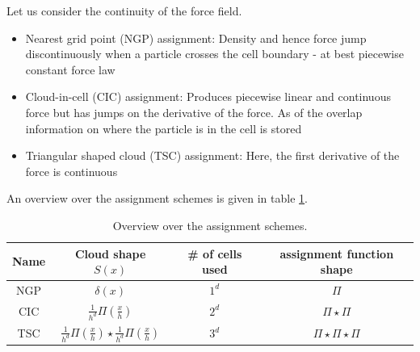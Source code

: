 Let us consider the continuity of the force field.
\begin{itemize}
    \item \textcolor{red1}{Nearest grid point (NGP) assignment}: Density and hence force jump discontinuously when a particle crosses the cell boundary - 
    at best piecewise constant force law
    \item \textcolor{yellow1}{Cloud-in-cell (CIC) assignment}: Produces piecewise linear and continuous force but has jumps on the derivative of the force. As of the overlap
    information on where the particle is in the cell is stored
    \item \textcolor{green1}{Triangular shaped cloud (TSC) assignment}: Here, the first derivative of the force is continuous
\end{itemize}

An overview over the assignment schemes is given in table \ref{tab:assignment_schemes}.

\begin{table}
    \centering
    \begin{tabular}{cccc}
        \hline Name & Cloud shape $S(x)$ & \# of cells used & assignment function shape \\
        \hline \hline NGP & $\delta(x)$ & $1^d$ & $\Pi$ \\
        \hline CIC & $\frac{1}{h^d} \Pi\left(\frac{x}{h}\right)$ & $2^d$ & $\Pi \star \Pi$ \\
        \hline TSC & $\frac{1}{h^d} \Pi\left(\frac{x}{h}\right) \star \frac{1}{h^d} \Pi\left(\frac{x}{h}\right)$ & $3^d$ & $\Pi \star \Pi \star \Pi$ \\
        \hline
        \end{tabular}
    \caption{Overview over the assignment schemes.}
    \label{tab:assignment_schemes}
\end{table}

